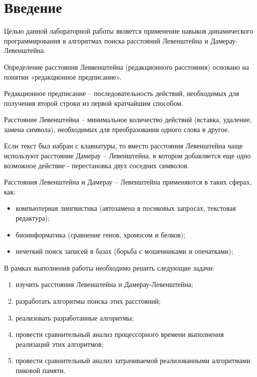 \chapter*{Введение}

Целью данной лабораторной работы является применение навыков динамического программирования в алгоритмах поиска расстояний Левенштейна и Дамерау-Левенштейна.

Определение расстояния Леввенштейна (редакционного расстояния) основано на понятии «редакционное предписание».

Редакционное предписание – последовательность действий, необходимых для получения второй строки из первой  кратчайшим способом. 

Расстояние Левенштейна – минимальное количество действий (вставка, удаление, замена символа), необходимых для преобразования одного слова в другое. 

Если текст был набран с клавиатуры, то вместо расстояния Левенштейна чаще используют расстояние Дамерау – Левенштейна, в котором добавляется еще одно возможное действие - перестановка двух соседних символов.~\cite{Passenger}

Расстояния Левенштейна и Дамерау – Левенштейна применяются в таких сферах, как: 
\begin{itemize}
	\item компьютерная лингвистика (автозамена в посиковых запросах, текстовая редактура);
	\item биоинформатика (сравнение генов, хромосом и белков);
	\item нечеткий поиск записей в базах (борьба с мошенниками и опечатками);
\end{itemize}

В рамках выполнения работы необходимо решить следующие задачи: 
\begin{enumerate}[label={\arabic*)}]
	\item изучить расстояния Левенштейна и Дамерау-Левенштейна;
	\item разработать алгоритмы поиска этих расстояний;
	\item реализовать разработанные алгоритмы;
	\item провести сравнительный анализ процессорного времени выполнения реализаций этих алгоритмов;
	\item провести сравнительный анализ затрачиваемой реализованными алгоритмами пиковой памяти.
\end{enumerate}
